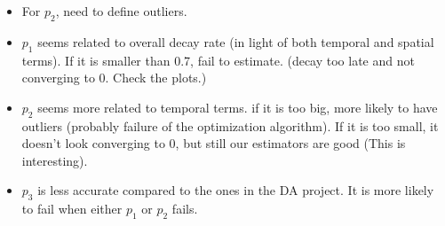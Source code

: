 \documentclass[11pt]{article}
\begin{document}
\begin{itemize}
\item For $p_2$, need to define outliers.\\

\item $p_1$ seems related to overall decay rate (in light of both temporal and spatial terms). If it is smaller than 0.7, fail to estimate. (decay too late and not converging to 0. Check the plots.)\\

\item $p_2$ seems more related to temporal terms. if it is too big, more likely to have outliers (probably failure of the optimization algorithm).
If it is too small, it doesn't look converging to 0, but still our estimators are good (This is interesting).\\

\item $p_3$ is less accurate compared to the ones in the DA project. It is more likely to fail when either $p_1$ or $p_2$ fails.\\

\pagebreak


\end{itemize}
\end{document}
